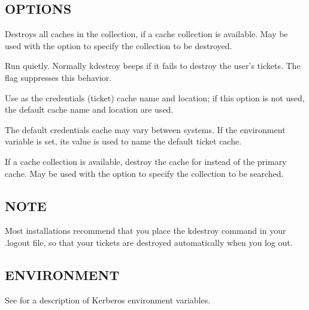 \documentclass[letterpaper,10pt,english]{sphinxmanual}
\begin{document}
\subsection{OPTIONS}
\label{\detokenize{user/user_commands/kdestroy:options}}\begin{description}
\sphinxAtStartPar
Destroys all caches in the collection, if a cache collection is
available.  May be used with the  option to specify the
collection to be destroyed.

\sphinxAtStartPar
Run quietly.  Normally kdestroy beeps if it fails to destroy the
user’s tickets.  The  flag suppresses this behavior.

\sphinxAtStartPar
Use  as the credentials (ticket) cache name and
location; if this option is not used, the default cache name and
location are used.

\sphinxAtStartPar
The default credentials cache may vary between systems.  If the
 environment variable is set, its value is used to
name the default ticket cache.

\sphinxAtStartPar
If a cache collection is available, destroy the cache for
 instead of the primary cache.  May be used with the
 option to specify the collection to be searched.

\end{description}


\subsection{NOTE}
\label{\detokenize{user/user_commands/kdestroy:note}}
\sphinxAtStartPar
Most installations recommend that you place the kdestroy command in
your .logout file, so that your tickets are destroyed automatically
when you log out.


\subsection{ENVIRONMENT}
\label{\detokenize{user/user_commands/kdestroy:environment}}
\sphinxAtStartPar
See {\hyperref[\detokenize{user/user_config/kerberos:kerberos-7}]{}} for a description of Kerberos environment
variables.
\end{document}
